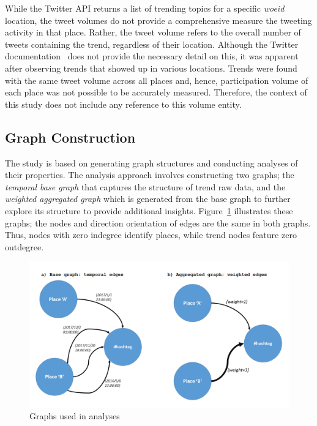 \documentclass{llncs}
\begin{document}
While the Twitter API returns a list of trending topics for a specific
{\emph{woeid}} location, the tweet volumes do not provide a
comprehensive measure the tweeting activity in that place. Rather, the
tweet volume refers to the overall number of tweets containing the
trend, regardless of their location. Although the Twitter
documentation~\cite{twittertrends} does not provide the necessary
detail on this, it was apparent after observing trends that showed up
in various locations. Trends were found with the same tweet volume
across all places and, hence, participation volume of each place was
not possible to be accurately measured. Therefore, the context of this
study does not include any reference to this volume entity.

\subsection{Graph Construction}

The study is based on generating graph structures and conducting
analyses of their properties. The analysis approach involves
constructing two graphs; the {\emph{temporal base graph}} that
captures the structure of trend raw data, and the {\emph{weighted
aggregated graph}} which is generated from the base graph to further
explore its structure to provide additional
insights. Figure~\ref{fig:graphexamples} illustrates these graphs; the
nodes and direction orientation of edges are the same in both
graphs. Thus, nodes with zero indegree identify places, while trend
nodes feature zero outdegree.

\begin{figure}[htb] \centering
\includegraphics[width=\columnwidth]{images/graphexamples.png}
\caption{Graphs used in analyses}
\label{fig:graphexamples}
\end{figure}
\end{document}
